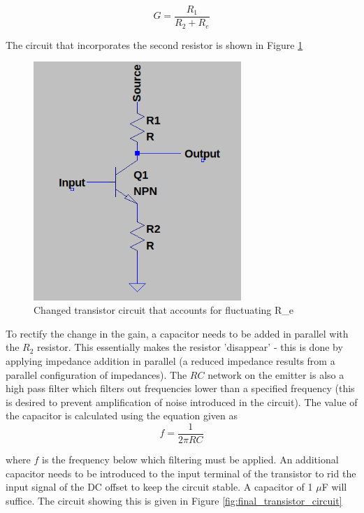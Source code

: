 \documentclass[12pt, a4paper]{article}
\begin{document}
 	\begin{equation}
 		G = \frac{R_1}{R_2 + R_e}
 	\end{equation} 

 	The circuit that incorporates the second resistor is shown in Figure \ref{fig:transistor_configuration_circuit_added_R2}

 	\begin{figure}[H]
 		\centering
		\label{fig:transistor_configuration_circuit_added_R2}
		\includegraphics[width=0.7\textwidth]{images/transistor_configuration_circuit_added_R2.png}
		\caption{Changed transistor circuit that accounts for fluctuating R\_e}
 	\end{figure}

 	To rectify the change in the gain, a capacitor needs to be added in parallel with the $R_2$ resistor. This essentially makes the resistor 'disappear' - this is done by applying impedance addition in parallel (a reduced impedance results from a parallel configuration of impedances). The $RC$ network on the emitter is also a high pass filter which filters out frequencies lower than a specified frequency (this is desired to prevent amplification of noise introduced in the circuit). The value of the capacitor is calculated using the equation given as 
 	\begin{equation}
 	 	f = \frac{1}{2\pi RC}
 	\end{equation}

 	where $f$ is the frequency below which filtering must be applied. An additional capacitor needs to be introduced to the input terminal of the transistor to rid the input signal of the DC offset to keep the circuit stable. A capacitor of 1 $\mu$F will suffice. The circuit showing this is given in Figure \ref{fig:final_transistor_circuit}
\end{document}
